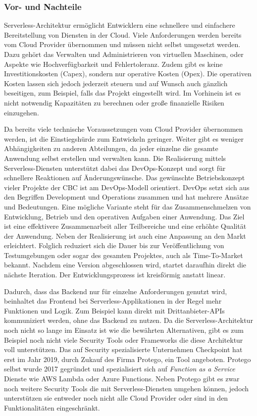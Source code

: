 \subsubsection{Vor- und Nachteile}
Serverless-Architektur ermöglicht Entwicklern eine schnellere und einfachere Bereitstellung von Diensten in der Cloud.
Viele Anforderungen werden bereits vom Cloud Provider übernommen und müssen nicht selbst umgesetzt werden.
Dazu gehört das Verwalten und Administrieren von virtuellen Maschinen, oder Aspekte wie Hochverfügbarkeit und Fehlertoleranz.
Zudem gibt es keine Investitionskosten (Capex), sondern nur operative Kosten (Opex).
Die operativen Kosten lassen sich jedoch jederzeit steuern und auf Wunsch auch gänzlich beseitigen, zum Beispiel, falls das Projekt eingestellt wird.
Im Vorhinein ist es nicht notwendig Kapazitäten zu berechnen oder große finanzielle Risiken einzugehen.

Da bereits viele technische Voraussetzungen vom Cloud Provider übernommen werden, ist die Einstiegshürde zum Entwickeln geringer.
Weiter gibt es weniger Abhängigkeiten zu anderen Abteilungen, da jeder einzelne die gesamte Anwendung selbst erstellen und verwalten kann.
Die Realisierung mittels Serverless-Diensten unterstützt dabei das DevOps-Konzept und sorgt für schnellere Reaktionen auf Änderungswünsche.
Das gewünschte Betriebskonzept vieler Projekte der CBC ist am DevOps-Modell orientiert.
DevOps setzt sich aus den Begriffen Development und Operations zusammen und hat mehrere Ansätze und Bedeutungen.
Eine mögliche Variante steht für das Zu­sam­men­schmel­zen von Entwicklung, Betrieb und den operativen Aufgaben einer Anwendung.
Das Ziel ist eine effektivere Zusammenarbeit aller Teilbereiche und eine erhöhte Qualität der Anwendung.
Neben der Realisierung ist auch eine Anpassung an den Markt erleichtert.
Folglich reduziert sich die Dauer bis zur Veröffentlichung von Testumgebungen oder sogar des gesamten Projektes, auch als Time-To-Market bekannt.
Nachdem eine Version abgeschlossen wird, startet daraufhin direkt die nächste Iteration.
Der Entwicklungsprozess ist kreisförmig anstatt linear.
\cite{DevOps}

\clearpage
Dadurch, dass das Backend nur für einzelne Anforderungen genutzt wird, beinhaltet das Frontend bei Serverless-Applikationen in der Regel mehr Funktionen und Logik.
Zum Beispiel kann direkt mit Drittanbieter-APIs kommuniziert werden, ohne das Backend zu nutzen.
Da die Serverless-Architektur noch nicht so lange im Einsatz ist wie die bewährten Alternativen, gibt es zum Beispiel noch nicht viele Security Tools oder Frameworks die diese Architektur voll unterstützen.
Das auf Security spezialisierte Unternehmen Checkpoint hat erst im Jahr 2019, durch Zukauf des Firma Protego, ein Tool angeboten.
Protego selbst wurde 2017 gegründet und spezialisiert sich auf \textsl{Function as a Service} Dienste wie AWS Lambda oder Azure Functions. \cite{Checkpoint}
Neben Protego gibt es zwar noch weitere Security Tools die mit Serverless-Diensten umgehen können, jedoch unterstützen sie entweder noch nicht alle Cloud Provider oder sind in den Funktionalitäten eingeschränkt. \cite{Security}

